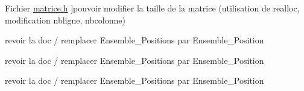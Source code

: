 \begin{DoxyRefList}
\-Fichier \hyperlink{matrice_8h}{matrice.h} ]pouvoir modifier la taille de la matrice (utilisation de realloc, modification nbligne, nbcolonne)  
\item[\label{todo__todo000013}%
\hypertarget{todo__todo000013}{}%
\-Fichier \hyperlink{position_8c}{position.c} ]revoir la doc / remplacer \-Ensemble\-\_\-\-Positions par \-Ensemble\-\_\-\-Position  
\item[\label{todo__todo000002}%
\hypertarget{todo__todo000002}{}%
\-Fichier \hyperlink{positions_8h}{positions.h} ]revoir la doc / remplacer \-Ensemble\-\_\-\-Positions par \-Ensemble\-\_\-\-Position  
\item[\label{todo__todo000006}%
\hypertarget{todo__todo000006}{}%
\-Fichier \hyperlink{test__ensemble_8c}{test\-\_\-ensemble.c} ]revoir la doc / remplacer \-Ensemble\-\_\-\-Positions par \-Ensemble\-\_\-\-Position 
\end{DoxyRefList}